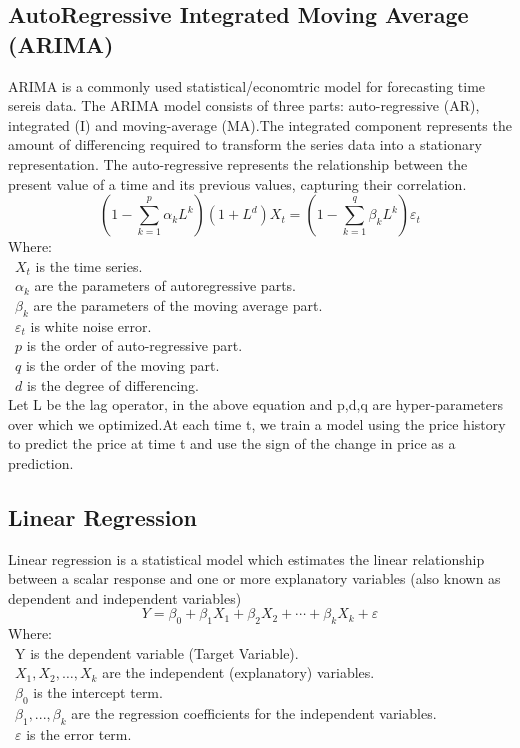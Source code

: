 \documentclass{ieeeojies}
\begin{document}
\subsection{AutoRegressive Integrated
Moving Average (ARIMA)} 
ARIMA is a commonly used statistical/economtric model for forecasting time sereis data. The ARIMA model consists of three parts: auto-regressive (AR), integrated (I) and moving-average (MA).The integrated component represents
the amount of differencing required to transform the series data
into a stationary representation. The auto-regressive represents the relationship between the present value of a time and its previous values, capturing their correlation. 
\begin{equation*}
(1 - \sum_{k=1}^{p} \alpha_k L^k)(1 + L^d)X_t = (1 - \sum_{k=1}^{q} \beta_k L^k) \varepsilon_t
\end{equation*}
Where:\\
\indent \textbullet\ \(X_t\) is the time series.\\
\indent \textbullet\ \(\alpha_k\) are the parameters of autoregressive parts. \\
\indent \textbullet\ \(\beta_k\) are the parameters of the moving average part.\\
\indent \textbullet\ \(\varepsilon_t\) is white noise error.\\
\indent \textbullet\ \(p\) is the order of auto-regressive part.\\
\indent \textbullet\ \(q\) is the order of the moving part.\\
\indent \textbullet\ \(d\) is the degree of differencing.\\

Let L be the lag operator, in the above equation and p,d,q are hyper-parameters over which we optimized.At each time t, we train a model using the price history to predict the price at time t and use the sign of the change in price as a prediction.
\subsection{Linear Regression}
 Linear regression is a statistical model which estimates the linear relationship between a scalar response and one or more explanatory variables (also known as dependent and independent variables)
 \[Y=\beta_0+\beta_1X_1+\beta_2X_2+\cdots+\beta_kX_k+\varepsilon\]
Where:\\
	\indent\textbullet\ Y is the dependent variable (Target Variable).\\
	\indent\textbullet\ \(X_1, X_2, \ldots, X_k\) are the independent (explanatory) variables.\\
	\indent\textbullet\ \(\beta_0\) is the intercept term.\\
	\indent\textbullet\ \(\beta_1,..., \beta_k\) are the regression coefficients for the independent variables.\\
	\indent\textbullet\ \(\varepsilon\) is the error term.
\end{document}
